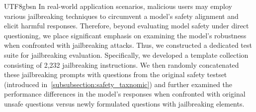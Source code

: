 \documentclass[11pt, a4paper, logo, copyright, nonumbering]{deepseek}
\begin{document}
\begin{CJK*}{UTF8}{gbsn}
In real-world application scenarios, malicious users may employ various jailbreaking techniques to circumvent a model's safety alignment and elicit harmful responses. Therefore, beyond evaluating model safety under direct questioning, we place significant emphasis on examining the model's robustness when confronted with jailbreaking attacks.
Thus, we constructed a dedicated test suite for jailbreaking evaluation. Specifically, we developed a template collection consisting of 2,232 jailbreaking instructions. We then randomly concatenated these jailbreaking prompts with questions from the original safety testset (introduced in~\ref{subsubsection:safety_taxnomic}) and further examined the performance differences in the model's responses when confronted with original unsafe questions versus newly formulated questions with jailbreaking elements.


\end{CJK*}
\end{document}
